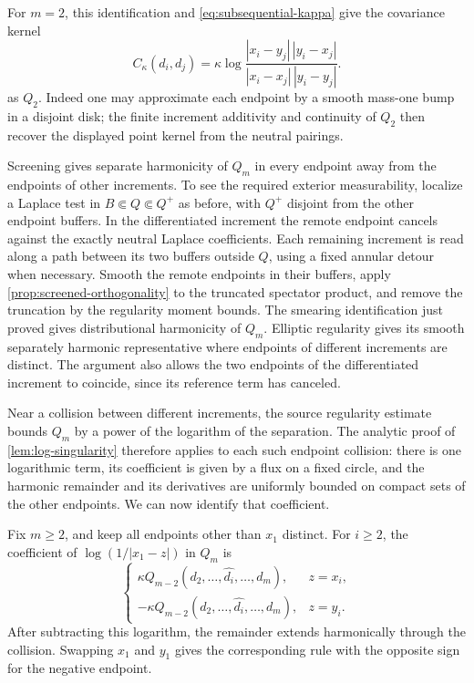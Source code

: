 For \(m=2\), this identification and \cref{eq:subsequential-kappa} give
the covariance kernel
\begin{equation}
 C_\kappa(d_i,d_j)
   =\kappa\log
       \frac{|x_i-y_j|\,|y_i-x_j|}
            {|x_i-x_j|\,|y_i-y_j|}.
 \label{eq:increment-covariance}
\end{equation}
as \(Q_2\). Indeed one may approximate each endpoint by a smooth mass-one
bump in a disjoint disk; the finite increment additivity and continuity of
\(Q_2\) then recover the displayed point kernel from the neutral pairings.

Screening gives separate harmonicity of \(Q_m\) in every endpoint away
from the endpoints of other increments. To see the required exterior
measurability, localize a Laplace test in \(B\Subset Q\Subset Q^+\) as
before, with \(Q^+\) disjoint from the other endpoint buffers. In the
differentiated increment the remote endpoint cancels against the exactly
neutral Laplace coefficients. Each remaining increment is read along a
path between its two buffers outside \(Q\), using a fixed annular detour
when necessary. Smooth the remote endpoints in their buffers, apply
\cref{prop:screened-orthogonality} to the truncated spectator product, and
remove the truncation by the regularity moment bounds. The smearing
identification just proved gives distributional harmonicity of \(Q_m\).
Elliptic regularity gives its smooth separately harmonic representative
where endpoints of different increments are distinct. The argument also
allows the two endpoints of the differentiated increment to coincide,
since its reference term has canceled.

Near a collision between different increments, the source regularity
estimate bounds \(Q_m\) by a power of the logarithm of the separation.
The analytic proof of \cref{lem:log-singularity} therefore applies to
each such endpoint collision: there is one logarithmic term, its coefficient
is given by a flux on a fixed circle, and the harmonic remainder and its
derivatives are uniformly bounded on compact sets of the other endpoints.
We can now identify that coefficient.

\begin{lemma}
\label{lem:plane-collision-coefficient}
Fix \(m\ge2\), and keep all endpoints other than \(x_1\) distinct. For
\(i\ge2\), the coefficient of \(\log(1/|x_1-z|)\) in \(Q_m\) is
\[
 \begin{cases}
  \kappa Q_{m-2}(d_2,\ldots,\widehat{d_i},\ldots,d_m),&z=x_i,\\
  -\kappa Q_{m-2}(d_2,\ldots,\widehat{d_i},\ldots,d_m),&z=y_i.
 \end{cases}
\]
After subtracting this logarithm, the remainder extends harmonically
through the collision. Swapping \(x_1\) and \(y_1\) gives the corresponding
rule with the opposite sign for the negative endpoint.
\end{lemma}

